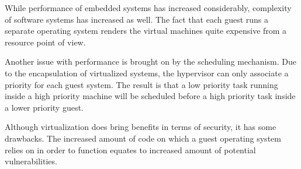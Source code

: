 While performance of embedded systems has increased considerably, complexity of software systems has increased as well. The fact that each guest runs a separate operating system renders the virtual machines quite expensive from a resource point of view.

Another issue with performance is brought on by the scheduling mechanism. Due to the encapsulation of virtualized systems, the hypervisor can only associate a priority for each guest system. The result is that a low priority task running inside a high priority machine will be scheduled before a high priority task inside a lower priority guest\cite{virt-embedded}.

Although virtualization does bring benefits in terms of security, it has some drawbacks. The increased amount of code on which a guest operating system relies on in order to function equates to increased amount of potential vulnerabilities.
